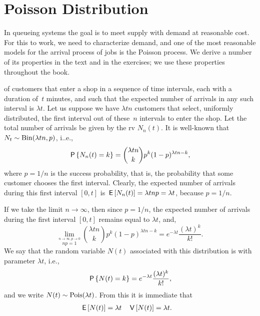 \documentclass[queueing-book.tex]{subfiles}
\begin{document}
\section{Poisson Distribution}\label{sec:poisson-distribution}

In queueing systems the goal is to meet supply with demand at reasonable cost.
For this to work, we need to characterize demand, and one of the most reasonable models for the arrival process of jobs is the Poisson process.
We derive a number of its properties in the text and in the exercises; we use these properties throughout the book.



 of customers that enter a shop in a sequence of time intervals, each with a duration of~$t$ minutes, and such that the expected number of arrivals in  any such interval is $\lambda t$.
Let us suppose we have $\lambda t n$ customers that select, uniformly distributed, the first interval out of these~$n$ intervals to enter the shop.
Let the total number of arrivals be given by the rv $N_n(t)$. It is well-known that $N_{t} \sim \Bin{\lambda t n, p}$, i..e.,
\begin{equation*}
 \P{N_n(t) = k} = {\lambda t n \choose k} p^k (1-p)^{\lambda t n-k},
\end{equation*}
where  $p=1/n$ is the success probability, that is, the probability that some customer chooses the first interval.
Clearly, the expected number of arrivals during this first interval $[0,t]$ is $\E{N_n(t)} = \lambda t n p = \lambda t$, because $p=1/n$.

If we take the limit $n\to\infty$, then since $p=1/n$,  the expected number of arrivals during the first interval $[0,t]$ remains equal to $\lambda t$,
and,
\begin{equation}\label{eq:bin}
  \lim_{\stackrel{n\to\infty, p\to 0}{np=1}}{\lambda t n \choose k} p^k (1-p)^{\lambda t n -k} = e^{-\lambda t}\frac{(\lambda t)^k}{k!}.
\end{equation}
We say that the random variable $N(t)$
associated with this distribution is  with parameter $\lambda t$, i.e.,
\begin{equation*}
 \P{N(t) = k} =
e^{-\lambda t} \frac{(\lambda t)^k}{k!},
\end{equation*}
and we write $N(t)\sim \Pois{\lambda t}$.%
From this it is immediate that
\begin{align}
\E{N(t)} &= \lambda t
& \V{N(t)} &= \lambda t.
\end{align}
\end{document}
